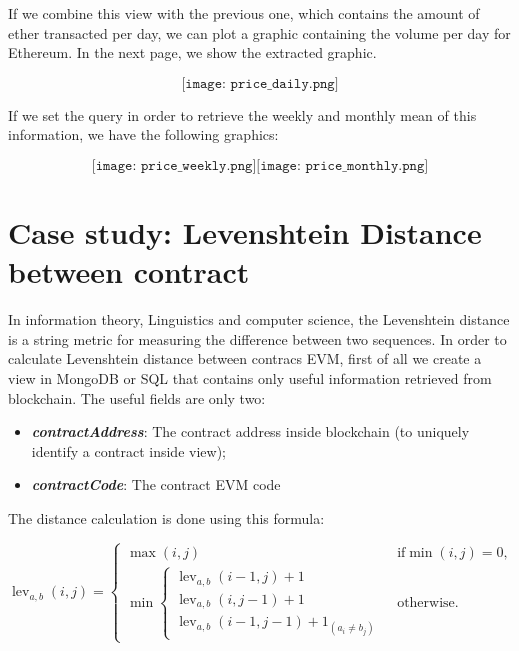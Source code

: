 If we combine this view with the previous one, which contains the amount of ether transacted per day, we can plot a graphic containing the volume per day for Ethereum. In the next page, we show the extracted graphic.
\begin{center}
    \[
        \texttt{[image: price\_daily.png]}
    \]
\end{center}
If we set the query in order to retrieve the weekly and monthly mean of this information, we have the following graphics:
\begin{center}
    \[
        \texttt{[image: price\_weekly.png]}
        \texttt{[image: price\_monthly.png]}
    \]
\end{center}
\section{Case study: Levenshtein Distance between contract}
In information theory, Linguistics and computer science, the Levenshtein distance is a string metric for measuring the difference between two sequences.
In order to calculate Levenshtein distance between contracs EVM, first of all we create a view in MongoDB or SQL that contains only useful information retrieved from blockchain.
The useful fields are only two:
\begin{itemize}
    \item \textit{\textbf{contractAddress}}: The contract address inside blockchain (to uniquely identify a contract inside view);
    \item \textit{\textbf{contractCode}}: The contract EVM code
\end{itemize}
The distance calculation is done using this formula:
\begin{center}
$\operatorname{lev}_{a,b}(i,j) = 
\begin{cases}
  \max(i,j) & \text{ if} \min(i,j)=0, \\
  \min \begin{cases}
      \operatorname{lev}_{a,b}(i-1,j) + 1 \\
      \operatorname{lev}_{a,b}(i,j-1) + 1 \\
      \operatorname{lev}_{a,b}(i-1,j-1) + 1_{(a_i \neq b_j)}
   \end{cases} & \text{ otherwise.}
\end{cases}
$
\end{center}

